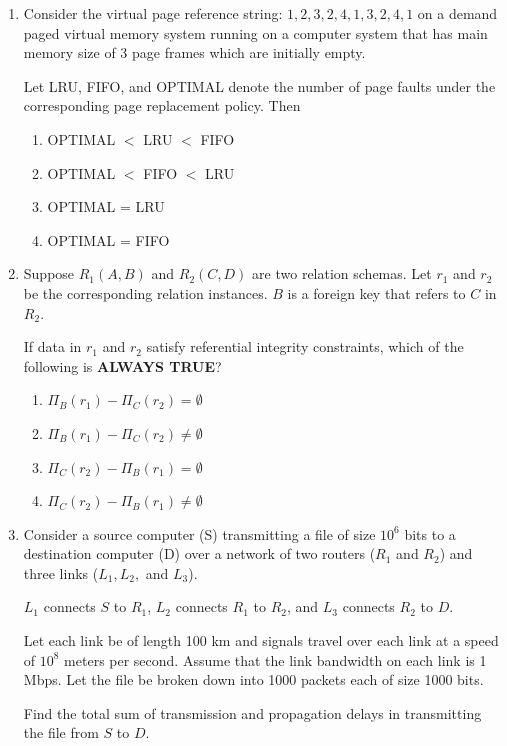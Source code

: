 \documentclass[journal]{IEEEtran}
\numberwithin{equation}{enumi}
\numberwithin{figure}{enumi}
\begin{document}
\begin{enumerate}
\item Consider the virtual page reference string:  
$
1, 2, 3, 2, 4, 1, 3, 2, 4, 1
$
on a demand paged virtual memory system running on a computer system that has main memory size of 3 page frames which are initially empty.  

Let LRU, FIFO, and OPTIMAL denote the number of page faults under the corresponding page replacement policy. Then

\begin{enumerate}
    \item OPTIMAL $<$ LRU $<$ FIFO
    \item OPTIMAL $<$ FIFO $<$ LRU
    \item OPTIMAL = LRU
    \item OPTIMAL = FIFO
\end{enumerate}

\item Suppose $R_1(A, B)$ and $R_2(C, D)$ are two relation schemas.  
Let $r_1$ and $r_2$ be the corresponding relation instances.  
$B$ is a foreign key that refers to $C$ in $R_2$.  

If data in $r_1$ and $r_2$ satisfy referential integrity constraints, which of the following is \textbf{ALWAYS TRUE}?

\begin{enumerate}
    \item $\Pi_B(r_1) - \Pi_C(r_2) = \emptyset$
    \item $\Pi_B(r_1) - \Pi_C(r_2) \neq \emptyset$
    \item $\Pi_C(r_2) - \Pi_B(r_1) = \emptyset$
    \item $\Pi_C(r_2) - \Pi_B(r_1) \neq \emptyset$
\end{enumerate}

\item Consider a source computer (S) transmitting a file of size $10^6$ bits to a destination computer (D) over a network of two routers ($R_1$ and $R_2$) and three links ($L_1, L_2,$ and $L_3$).  

$L_1$ connects $S$ to $R_1$, $L_2$ connects $R_1$ to $R_2$, and $L_3$ connects $R_2$ to $D$.  

Let each link be of length 100 km and signals travel over each link at a speed of $10^8$ meters per second. Assume that the link bandwidth on each link is 1 Mbps. Let the file be broken down into 1000 packets each of size 1000 bits.  

Find the total sum of transmission and propagation delays in transmitting the file from $S$ to $D$.


\end{enumerate}
\end{document}
